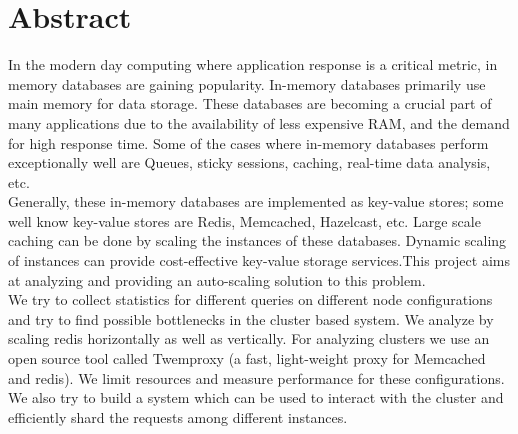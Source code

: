 \documentclass[11pt]{article}
\begin{document}

\section*{Abstract}
In the modern day computing where application response is a 
critical metric, in memory databases are gaining popularity. In-memory 
databases primarily use main memory for data storage. These databases 
are becoming a crucial part of many applications due to the availability 
of less expensive RAM, and the demand for high response time.  Some of 
the cases where in-memory databases perform exceptionally well are 
Queues, sticky sessions, caching, real-time data analysis, etc.
\\

Generally, these in-memory databases are implemented as key-value 
stores; some well know key-value stores are Redis, Memcached, Hazelcast, 
etc. Large scale caching can be done by scaling the instances of these 
databases. Dynamic scaling of instances can provide cost-effective 
key-value storage services.This project aims at analyzing and providing 
an auto-scaling solution to this problem.
\\

We try to collect statistics for different queries on different node 
configurations and try to find possible bottlenecks in the cluster based 
system. We analyze by scaling redis horizontally as well as vertically. 
For analyzing clusters we use an open source tool called Twemproxy (a 
fast, light-weight proxy for Memcached and redis). We limit resources 
and measure performance for these configurations. We also try to build a 
system which can be used to interact with the cluster and efficiently 
shard the requests among different instances.
\end{document}
